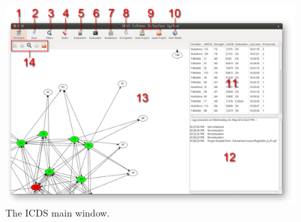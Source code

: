 \begin{figure}
\centering
\includegraphics[width=\textwidth]{../Images/ICDS}
\caption{The ICDS main window.}
\label{fig:icds}
\end{figure}


